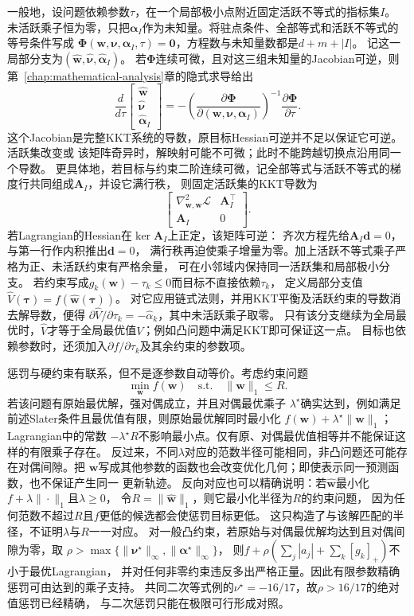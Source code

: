 一般地，设问题依赖参数$\tau$，在一个局部极小点附近固定活跃不等式的指标集$I$。
未活跃乘子恒为零，只把$\bm\alpha_I$作为未知量。将驻点条件、全部等式和活跃不等式的等号条件写成
$\bm\Phi(\bm w,\bm\nu,\bm\alpha_I,\tau)=\bm0$，方程数与未知量数都是$d+m+|I|$。
记这一局部分支为$(\widehat{\bm w},\widehat{\bm\nu},\widehat{\bm\alpha}_I)$。
若$\bm\Phi$连续可微，且对这三组未知量的Jacobian可逆，则第~\ref{chap:mathematical-analysis}章的隐式求导给出
\[
  \frac{d}{d\tau}
  \begin{bmatrix}\widehat{\bm w}\\\widehat{\bm\nu}\\\widehat{\bm\alpha}_I\end{bmatrix}
  =
  -\left(\frac{\partial\bm{\Phi}}
  {\partial(\bm{w},\bm{\nu},\bm{\alpha}_I)}\right)^{-1}
  \frac{\partial\bm{\Phi}}{\partial\tau}.
\]
这个Jacobian是完整KKT系统的导数，原目标Hessian可逆并不足以保证它可逆。活跃集改变或
该矩阵奇异时，解映射可能不可微；此时不能跨越切换点沿用同一个导数。
更具体地，若目标与约束二阶连续可微，记全部等式与活跃不等式的梯度行共同组成$\bm A_I$，并设它满行秩，
则固定活跃集的KKT导数为
\[
 \begin{bmatrix}
 \nabla_{\bm w,\bm w}^2\mathcal L&\bm A_I^\top\\
 \bm A_I&0
 \end{bmatrix}.
\]
若Lagrangian的Hessian在$\ker\bm A_I$上正定，该矩阵可逆：
齐次方程先给$\bm A_I\bm d=0$，与第一行作内积推出$\bm d=0$，
满行秩再迫使乘子增量为零。加上活跃不等式乘子严格为正、未活跃约束有严格余量，
可在小邻域内保持同一活跃集和局部极小分支。
若约束写成$g_k(\bm w)-\tau_k\leq0$而目标不直接依赖$\tau_k$，
定义局部分支值$\widehat V(\bm\tau)=f(\widehat{\bm w}(\bm\tau))$。
对它应用链式法则，并用KKT平衡及活跃约束的导数消去解导数，便得
$\partial\widehat V/\partial\tau_k=-\widehat\alpha_k$，其中未活跃乘子取零。
只有该分支继续为全局最优时，$\widehat V$才等于全局最优值$V$；例如凸问题中满足KKT即可保证这一点。
目标也依赖参数时，还须加入$\partial f/\partial\tau_k$及其余约束的参数项。

惩罚与硬约束有联系，但不是逐参数自动等价。考虑约束问题
\[
  \min_{\bm{w}}f(\bm{w})
  \quad\text{s.t.}\quad
  \lVert\bm{w}\rVert_1\leq R.
\]
若该问题有原始最优解，强对偶成立，并且对偶最优乘子
$\lambda^\star$确实达到，例如满足前述Slater条件且最优值有限，则原始最优解同时最小化
$f(\bm{w})+\lambda^\star\lVert\bm{w}\rVert_1$；Lagrangian中的常数
$-\lambda^\star R$不影响最小点。仅有原、对偶最优值相等并不能保证这样的有限乘子存在。
反过来，不同$\lambda$对应的范数半径可能相同，非凸问题还可能存在对偶间隙。把
$\bm{w}$写成其他参数的函数也会改变优化几何；即使表示同一预测函数，也不保证产生同一
更新轨迹。
反向对应也可以精确说明：若$\widehat{\bm w}$最小化$f+\lambda\|\cdot\|_1$且$\lambda\geq0$，
令$R=\|\widehat{\bm w}\|_1$，则它最小化半径为$R$的约束问题，
因为任何范数不超过$R$且$f$更低的候选都会使惩罚目标更低。
这只构造了与该解匹配的半径，不证明$\lambda$与$R$一一对应。
对一般凸约束，若原始与对偶最优解均达到且对偶间隙为零，取
$\rho>\max\{\|\bm\nu^\star\|_\infty,\|\bm\alpha^\star\|_\infty\}$，
则$f+\rho(\sum_j|a_j|+\sum_k[g_k]_+)$不小于最优Lagrangian，
并对任何非零约束违反多出严格正量。因此有限参数精确惩罚可由达到的乘子支持。
共同二次等式例的$\nu^\star=-16/17$，故$\rho>16/17$的绝对值惩罚已经精确，
与二次惩罚只能在极限可行形成对照。

